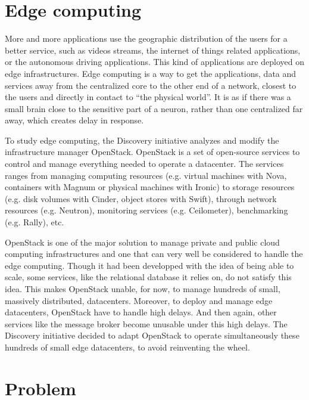 \section{Edge computing}

More and more applications use the geographic distribution of the users for a better service, such as videos streams, the internet of things related applications, or the autonomous driving applications. This kind of applications are deployed on edge infrastructures. Edge computing is a way to get the applications, data and services away from the centralized core to the other end of a network, closest to the users and directly in contact to ``the physical world''. It is as if there was a small brain close to the sensitive part of a neuron, rather than one centralized far away, which creates delay in response.

To study edge computing, the Discovery initiative analyzes and modify the infrastructure manager OpenStack. OpenStack is a set of open-source services to control and manage everything needed to operate a datacenter. The services ranges from managing computing resources (e.g. virtual machines with Nova, containers with Magnum or physical machines with Ironic) to storage resources (e.g. disk volumes with Cinder, object stores with Swift), through network resources (e.g. Neutron), monitoring services (e.g. Ceilometer), benchmarking (e.g. Rally), etc.

OpenStack is one of the major solution to manage private and public cloud computing infrastructures and one that can very well be considered to handle the edge computing. Though it had been developped with the idea of being able to scale, some services, like the relational database it relies on, do not satisfy this idea. This makes OpenStack unable, for now, to manage hundreds of small, massively distributed, datacenters. Moreover, to deploy and manage edge datacenters, OpenStack have to handle high delays. And then again, other services like the message broker become unusable under this high delays. The Discovery initiative decided to adapt OpenStack to operate simultaneously these hundreds of small edge datacenters, to avoid reinventing the wheel.
\section{Problem}
